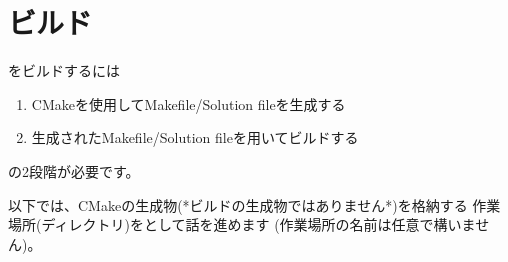 \newpage
\section{ビルド}
\label{sec:Build}
\parindent=0pt

\SprLib をビルドするには
\begin{enumerate}
  \item	CMakeを使用してMakefile/Solution fileを生成する
  \item	生成されたMakefile/Solution fileを用いてビルドする
\end{enumerate}
の2段階が必要です。

\medskip
以下では、CMakeの生成物(*ビルドの生成物ではありません*)を格納する
作業場所(ディレクトリ)を\DQuote{\BldDir}として話を進めます
(作業場所の名前は任意で構いません)。

\bigskip
